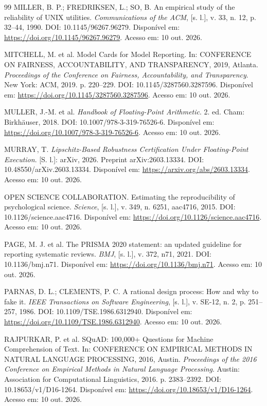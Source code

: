 \documentclass[12pt,openany,oneside,a4paper,brazil,chapter=TITLE]{abntex2}
\begin{document}
\begin{SingleSpacing}
\begin{thebibliography}{99}
 MILLER, B. P.; FREDRIKSEN, L.; SO, B. An empirical study of the reliability of UNIX utilities. \textit{Communications of the ACM}, [s. l.], v. 33, n. 12, p. 32--44, 1990. DOI: 10.1145/96267.96279. Disponível em: \url{https://doi.org/10.1145/96267.96279}. Acesso em: 10 out. 2026.

 MITCHELL, M. et al. Model Cards for Model Reporting. In: CONFERENCE ON FAIRNESS, ACCOUNTABILITY, AND TRANSPARENCY, 2019, Atlanta. \textit{Proceedings of the Conference on Fairness, Accountability, and Transparency}. New York: ACM, 2019. p. 220--229. DOI: 10.1145/3287560.3287596. Disponível em: \url{https://doi.org/10.1145/3287560.3287596}. Acesso em: 10 out. 2026.

 MULLER, J.-M. et al. \textit{Handbook of Floating-Point Arithmetic}. 2. ed. Cham: Birkhäuser, 2018. DOI: 10.1007/978-3-319-76526-6. Disponível em: \url{https://doi.org/10.1007/978-3-319-76526-6}. Acesso em: 10 out. 2026.

 MURRAY, T. \textit{Lipschitz-Based Robustness Certification Under Floating-Point Execution}. [S. l.]: arXiv, 2026. Preprint arXiv:2603.13334. DOI: 10.48550/arXiv.2603.13334. Disponível em: \url{https://arxiv.org/abs/2603.13334}. Acesso em: 10 out. 2026.

 OPEN SCIENCE COLLABORATION. Estimating the reproducibility of psychological science. \textit{Science}, [s. l.], v. 349, n. 6251, aac4716, 2015. DOI: 10.1126/science.aac4716. Disponível em: \url{https://doi.org/10.1126/science.aac4716}. Acesso em: 10 out. 2026.

 PAGE, M. J. et al. The PRISMA 2020 statement: an updated guideline for reporting systematic reviews. \textit{BMJ}, [s. l.], v. 372, n71, 2021. DOI: 10.1136/bmj.n71. Disponível em: \url{https://doi.org/10.1136/bmj.n71}. Acesso em: 10 out. 2026.

 PARNAS, D. L.; CLEMENTS, P. C. A rational design process: How and why to fake it. \textit{IEEE Transactions on Software Engineering}, [s. l.], v. SE-12, n. 2, p. 251--257, 1986. DOI: 10.1109/TSE.1986.6312940. Disponível em: \url{https://doi.org/10.1109/TSE.1986.6312940}. Acesso em: 10 out. 2026.

 RAJPURKAR, P. et al. SQuAD: 100,000+ Questions for Machine Comprehension of Text. In: CONFERENCE ON EMPIRICAL METHODS IN NATURAL LANGUAGE PROCESSING, 2016, Austin. \textit{Proceedings of the 2016 Conference on Empirical Methods in Natural Language Processing}. Austin: Association for Computational Linguistics, 2016. p. 2383--2392. DOI: 10.18653/v1/D16-1264. Disponível em: \url{https://doi.org/10.18653/v1/D16-1264}. Acesso em: 10 out. 2026.


\end{thebibliography}
\end{SingleSpacing}
\end{document}
